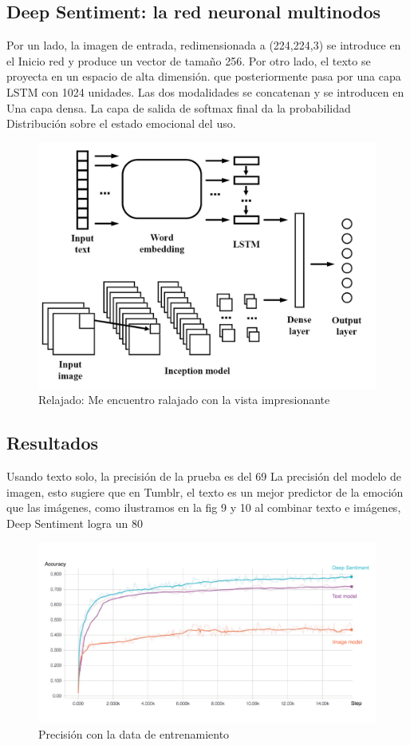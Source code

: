 \documentclass[conference]{IEEEtran}
\begin{document}
\subsection{Deep Sentiment: la red neuronal multinodos}
Por un lado, la imagen de entrada, redimensionada a (224,224,3) se introduce en el Inicio
red y produce un vector de tamaño 256. Por otro lado, el texto se proyecta en un espacio de alta dimensión. que posteriormente pasa por una capa LSTM con 1024
unidades. Las dos modalidades se concatenan y se introducen en
Una capa densa. La capa de salida de softmax final da la probabilidad
Distribución sobre el estado emocional del uso.
\begin{figure}
\centerline{\includegraphics[width=\textwidth,width=9cm]{figura7.png}}
\caption{Relajado: Me encuentro ralajado con la vista impresionante}
\label{fig}
\end{figure}

\subsection{Resultados}
Usando texto solo, la precisión de la prueba es del 69%
La precisión del modelo de imagen, esto sugiere que en Tumblr, el texto es un
mejor predictor de la emoción que las imágenes, como ilustramos en la fig 9 y 10
al combinar texto e imágenes, Deep Sentiment logra un 80%
\begin{figure}
\centerline{\includegraphics[width=\textwidth,width=9cm]{figura10.png}}
\caption{Precisión con la data de entrenamiento}
\label{fig}
\end{figure}
\end{document}
